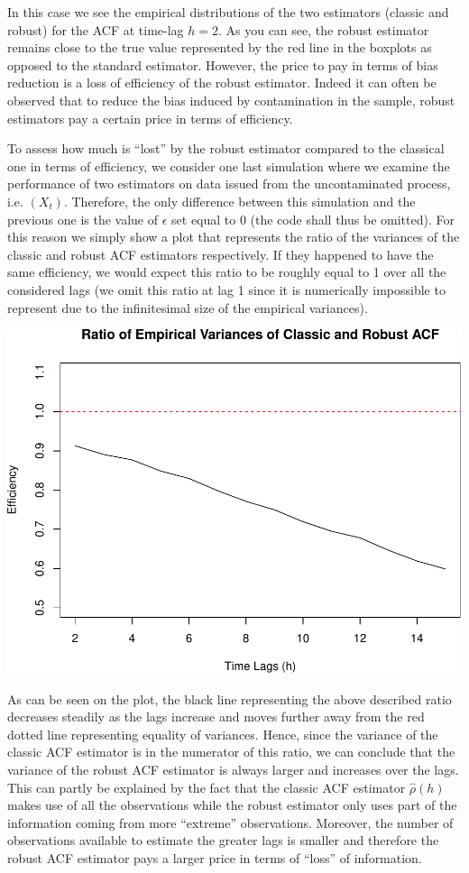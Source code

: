 \documentclass[]{book}
\theoremstyle{definition}
\theoremstyle{definition}
\theoremstyle{definition}
\theoremstyle{remark}
\begin{document}
In this case we see the empirical distributions of the two estimators
(classic and robust) for the ACF at time-lag \(h = 2\). As you can see,
the robust estimator remains close to the true value represented by the
red line in the boxplots as opposed to the standard estimator. However,
the price to pay in terms of bias reduction is a loss of efficiency of
the robust estimator. Indeed it can often be observed that to reduce the
bias induced by contamination in the sample, robust estimators pay a
certain price in terms of efficiency.

To assess how much is ``lost'' by the robust estimator compared to the
classical one in terms of efficiency, we consider one last simulation
where we examine the performance of two estimators on data issued from
the uncontaminated process, i.e. \((X_t)\). Therefore, the only
difference between this simulation and the previous one is the value of
\(\epsilon\) set equal to \(0\) (the code shall thus be omitted). For
this reason we simply show a plot that represents the ratio of the
variances of the classic and robust ACF estimators respectively. If they
happened to have the same efficiency, we would expect this ratio to be
roughly equal to 1 over all the considered lags (we omit this ratio at
lag 1 since it is numerically impossible to represent due to the
infinitesimal size of the empirical variances).

\includegraphics{ts_files/figure-latex/simulationRobust3-1.pdf}

As can be seen on the plot, the black line representing the above
described ratio decreases steadily as the lags increase and moves
further away from the red dotted line representing equality of
variances. Hence, since the variance of the classic ACF estimator is in
the numerator of this ratio, we can conclude that the variance of the
robust ACF estimator is always larger and increases over the lags. This
can partly be explained by the fact that the classic ACF estimator
\(\hat{\rho}(h)\) makes use of all the observations while the robust
estimator only uses part of the information coming from more ``extreme''
observations. Moreover, the number of observations available to estimate
the greater lags is smaller and therefore the robust ACF estimator pays
a larger price in terms of ``loss'' of information.
\end{document}
